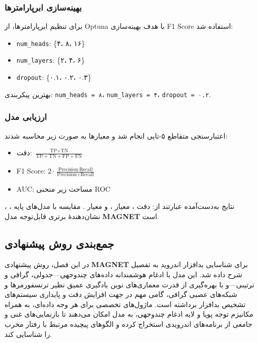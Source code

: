 \subsubsection{بهینه‌سازی ابرپارامترها}
برای تنظیم ابرپارامترها، از Optuna با هدف بهینه‌سازی F1 Score استفاده شد:
\begin{itemize}
    \item \texttt{num\_heads}: \{۴، ۸، ۱۶\}
    \item \texttt{num\_layers}: \{۲، ۴، ۶\}
    \item \texttt{dropout}: \{۰.۱، ۰.۲، ۰.۳\}
\end{itemize}
بهترین پیکربندی: \texttt{num\_heads = ۸}، \texttt{num\_layers = ۴}، \texttt{dropout = ۰.۲}.

\subsubsection{ارزیابی مدل}
اعتبارسنجی متقاطع ۵-تایی انجام شد و معیارها به صورت زیر محاسبه شدند:
\begin{itemize}
    \item دقت: \( \frac{\text{TP} + \text{TN}}{\text{TP} + \text{TN} + \text{FP} + \text{FN}} \)
    \item F1 Score: \( 2 \cdot \frac{\text{Precision} \cdot \text{Recall}}{\text{Precision} + \text{Recall}} \)
    \item AUC: مساحت زیر منحنی ROC
\end{itemize}

نتایج به‌دست‌آمده عبارتند از: دقت ، معیار ، و معیار . مقایسه با مدل‌های پایه ، ،  نشان‌دهندهٔ برتری قابل‌توجه مدل \textbf{MAGNET} است.

\subsection{جمع‌بندی روش پیشنهادی}
در این فصل، روش پیشنهادی \textbf{MAGNET} برای شناسایی بدافزار اندروید به تفصیل شرح داده شد. این مدل با ادغام هوشمندانه داده‌های چندوجهی—جدولی، گرافی و ترتیبی—و با بهره‌گیری از قدرت معماری‌های نوین یادگیری عمیق نظیر ترنسفورمرها و شبکه‌های عصبی گرافی، گامی مهم در جهت افزایش دقت و پایداری سیستم‌های تشخیص بدافزار برداشته است. ماژول‌های تخصصی برای هر وجه داده‌ای، به همراه مکانیزم توجه پویا و لایه ادغام چندوجهی، به مدل امکان می‌دهند تا بازنمایی‌های غنی و جامعی از برنامه‌های اندرویدی استخراج کرده و الگوهای پیچیده مرتبط با رفتار مخرب را شناسایی کند.

